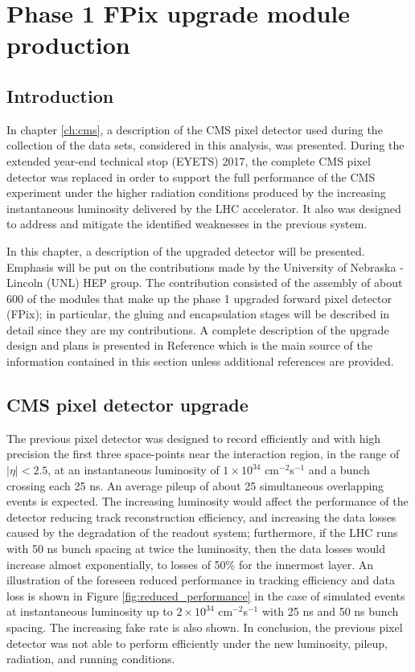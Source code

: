 \setcounter{chapter}{6}
\chapter{Phase 1 FPix upgrade module production}

\section{Introduction}

In chapter \ref{ch:cms}, a description of the CMS pixel detector used during the collection of the data sets, considered in this analysis, was presented. During the extended year-end technical stop (EYETS) 2017, the complete CMS pixel detector was replaced in order to support the full performance of the CMS experiment under the higher radiation conditions produced by the increasing instantaneous luminosity delivered  by the LHC accelerator. It also was designed to address and mitigate the identified weaknesses in the previous system.

In this chapter, a description of the upgraded detector will be presented. Emphasis will be put on the contributions made by the University of Nebraska - Lincoln (UNL) HEP group. The contribution consisted of the assembly of about 600 of the modules that make up the phase 1 upgraded forward pixel detector (FPix); in particular, the gluing and encapsulation stages will be described in detail since they are my contributions. A complete description of the upgrade design and plans is presented in Reference \cite{pix_tdr} which is the main source of the information contained in this section unless additional references are provided.   

\section{CMS pixel detector upgrade}

The previous pixel detector was designed to record efficiently and with high precision the first three space-points near the interaction region, in the range of $|\eta|<2.5$,  at an instantaneous luminosity of $1\times10^{34}$ cm$^{-2}$s$^{-1}$ and a bunch crossing each 25 ns. An average pileup of about 25 simultaneous overlapping events is expected. The increasing luminosity would affect the performance of the detector reducing track reconstruction efficiency, and increasing the data losses caused by the degradation of the readout system; furthermore, if the LHC runs with 50 ns bunch spacing at twice the luminosity, then the data losses would increase almost exponentially, to losses of 50\% for the innermost layer. An illustration of the foreseen reduced performance in tracking efficiency and data loss is shown in Figure \ref{fig:reduced_performance} in the case of simulated \ttbar events at instantaneous luminosity up to $2\times10^{34}$ cm$^{-2}$s$^{-1}$ with 25 ns and 50 ns bunch spacing. The increasing fake rate is also shown. In conclusion, the previous pixel detector was not able to perform efficiently under the new luminosity, pileup, radiation, and running conditions.  

